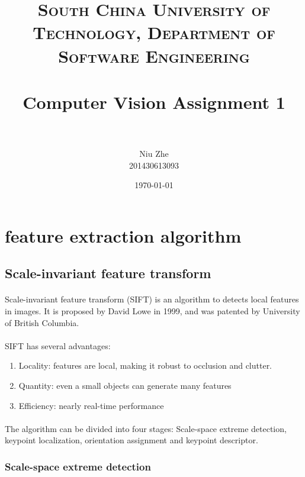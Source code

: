 \documentclass[paper=a4, fontsize=11pt]{scrartcl} %
\title{	
\normalfont \normalsize 
\textsc{South China University of Technology, Department of Software Engineering} \\ [25pt] %
\horrule{0.5pt} \\[0.4cm] %
\huge Computer Vision Assignment 1 \\ %
\horrule{2pt} \\[0.5cm] %
}
\author{Niu Zhe \\201430613093} %
\date{\normalsize\today} %
\numberwithin{equation}{section} %
\numberwithin{figure}{section} %
\numberwithin{table}{section} %
\begin{document}
\maketitle %


\section{feature extraction algorithm}

\subsection{Scale-invariant feature transform}

\paragraph{}
Scale-invariant feature transform (SIFT) is an algorithm to detects local features in images. 
It is proposed by David Lowe in 1999, and was patented by University of British Columbia.

\paragraph{}
SIFT has several advantages: 
\begin{enumerate}
\item Locality: features are local, making it robust to occlusion and clutter.
\item Quantity: even a small objects can generate many features
\item Efficiency: nearly real-time performance
\end{enumerate}

\paragraph{}
The algorithm can be divided into four stages: 
Scale-space extreme detection, keypoint localization, orientation assignment and keypoint descriptor. 

\subsubsection{Scale-space extreme detection}
\end{document}

